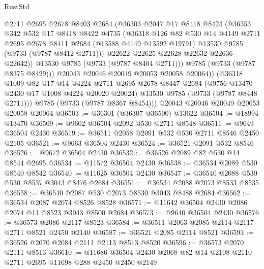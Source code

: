 \begin{lexlean}{RustStd}
\begin{coremodule}
              @2711
              @2695
              @2678
              @8403
              @2684
              (@36303
                @2047
                @17
                @8418
                @8424
                (@36353
                  @342
                  @532
                  @17
                  @8418
                  @8422
                  @4735
                  (@36318
                    @126
                    @82
                    @530
                    @14
                    @4149
                    @2711
                    @2695
                    @2678
                    @8411
                    @2684
                    (@13588 @4149 @13592 @19791)
                    @13530
                    @9785
                    (@9733 (@9787 @8412 @2711)))
                  @22622
                  @22625
                  @22628
                  @22632
                  @22636
                  @22642))
              @13530
              @9785
              (@9733 (@9787 @8404 @2711)))
            @9785
            (@9733 (@9787 @8375 @8429)))
          @20043
          @20046
          @20049
          @20053
          @20058
          @20064))
      (@36318
        @1009
        @82
        @17
        @14
        @4224
        @2711
        @2695
        @2678
        @8447
        @2684
        (@9756 @13470 @2430 @17 @1008 @4224 @20020 @20024)
        @13530
        @9785
        (@9733 (@9787 @8448 @2711)))
      @9785
      (@9733 (@9787 @8367 @8454)))
    @20043
    @20046
    @20049
    @20053
    @20058
    @20064
@36503 := @36301 (@36307 @36500) @13622
@36504 := @18994 @13470
@36509 := @9602 @36504 @2092 @530 @2711 @8548
@36511 := @9649 @36504 @2430
@36519 := @36511 @2058 @2091 @532 @530 @2711 @8546 @2450 @2105
@36521 := @9663 @36504 @2430
@36524 := @36521 @2091 @532 @8546
@36526 := @9672 @36504 @2430
@36532 := @36526 @2089 @82 @530 @14 @8544 @2695
@36534 := @11572 @36504 @2430
@36538 := @36534 @2089 @530 @8540 @8542
@36540 := @11625 @36504 @2430
@36547 := @36540 @2088 @530 @530 @8537 @3043 @8476 @2684
@36551 := @36534 @2088 @2073 @8533 @8535
@36558 := @36540 @2087 @530 @2073 @8530 @3043 @8488 @2684
@36562 := @36534 @2087 @2074 @8526 @8528
@36571 := @11642 @36504 @2430 @2086 @2074 @11 @8523 @3043 @8500 @2684
@36573 := @9640 @36504 @2430
@36576 := @36573 @2086 @2117 @8523
@36584 := @36511 @2063 @2085 @2114 @2117 @2711 @8521 @2450 @2140
@36587 := @36521 @2085 @2114 @8521
@36593 := @36526 @2070 @2084 @2111 @2113 @8513 @8520
@36596 := @36573 @2070 @2111 @8513
@36610 := @11686 @36504 @2430 @2068 @82 @14 @2108 @2110 @2711 @2695 @11698 @288 @2450 @2450 @2149

\end{coremodule}
\end{lexlean}
